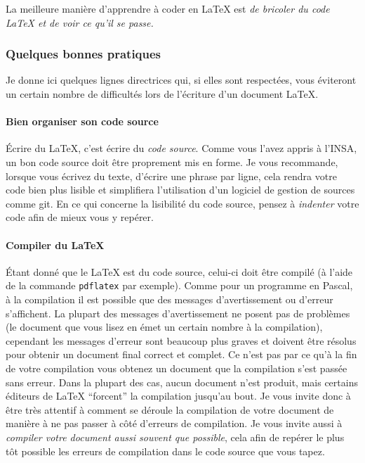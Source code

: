         La meilleure manière d'apprendre à coder en \LaTeX{} est \emph{de bricoler du code \LaTeX{} et de voir ce qu'il se passe.}

        \subsubsection{Quelques bonnes pratiques}
            Je donne ici quelques lignes directrices qui, si elles sont respectées, vous éviteront un certain nombre de difficultés lors de l'écriture d'un document \LaTeX{}.
        
            \paragraph{Bien organiser son code source}
                Écrire du \LaTeX{}, c'est écrire du \emph{code source}.
                Comme vous l'avez appris à l'INSA, un bon code source doit être proprement mis en forme.
                Je vous recommande, lorsque vous écrivez du texte, d'écrire une phrase par ligne, cela rendra votre code bien plus lisible et simplifiera l'utilisation d'un logiciel de gestion de sources comme git.
                En ce qui concerne la lisibilité du code source, pensez à \emph{indenter} votre code afin de mieux vous y repérer.
            
             \paragraph{Compiler du \LaTeX{}}
                Étant donné que le \LaTeX{} est du code source, celui-ci doit être compilé (à l'aide de la commande \verb|pdflatex| par exemple).
                Comme pour un programme en Pascal, à la compilation il est possible que des messages d'avertissement ou d'erreur s'affichent.
                La plupart des messages d'avertissement ne posent pas de problèmes (le document que vous lisez en émet un certain nombre à la compilation), cependant les messages d'erreur sont beaucoup plus graves et doivent être résolus pour obtenir un document final correct et complet.
                Ce n'est pas par ce qu'à la fin de votre compilation vous obtenez un document que la compilation s'est passée sans erreur.
                Dans la plupart des cas, aucun document n'est produit, mais certains éditeurs de \LaTeX{} \enquote{forcent} la compilation jusqu'au bout.
                Je vous invite donc à être très attentif à comment se déroule la compilation de votre document de manière à ne pas passer à côté d'erreurs de compilation.
                Je vous invite aussi à \emph{compiler votre document aussi souvent que possible}, cela afin de repérer le plus tôt possible les erreurs de compilation dans le code source que vous tapez.
        
